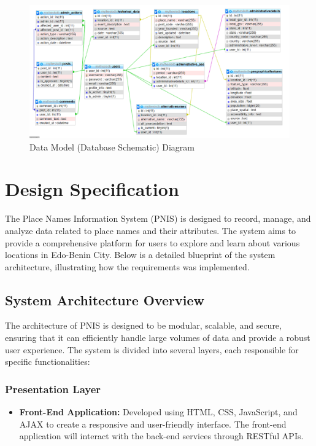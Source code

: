 \newpage

\begin{figure}
    \centering
    \includegraphics[width=1\linewidth]{model_schema.png}
    \caption{Data Model (Database Schematic) Diagram}
    \label{fig:enter-label}
\end{figure}


\section{Design Specification}
The Place Names Information System (PNIS) is designed to record, manage, and analyze data related to place names and their attributes. The system aims to provide a comprehensive platform for users to explore and learn about various locations in Edo-Benin City. Below is a detailed blueprint of the system architecture, illustrating how the requirements was implemented.

\subsection{System Architecture Overview}
The architecture of PNIS is designed to be modular, scalable, and secure, ensuring that it can efficiently handle large volumes of data and provide a robust user experience. The system is divided into several layers, each responsible for specific functionalities:

\subsubsection{Presentation Layer}
\begin{itemize}
    \item \textbf{Front-End Application:} Developed using HTML, CSS, JavaScript, and AJAX to create a responsive and user-friendly interface. The front-end application will interact with the back-end services through RESTful APIs.
\end{itemize}

